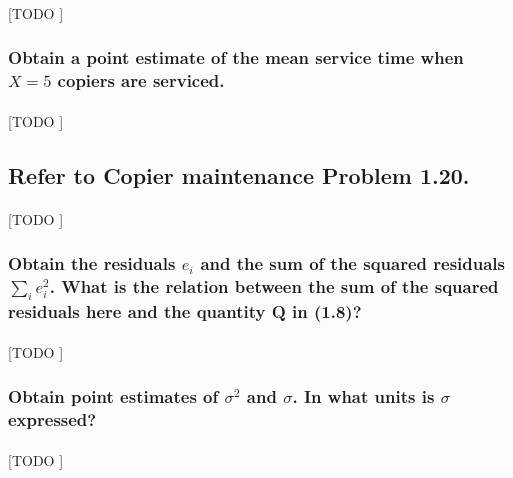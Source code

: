 \documentclass{article}
\begin{document}
        \paragraph{}
        [TODO ]

      \subsubsection{Obtain a point estimate of the mean service time when $X = 5$ copiers are serviced.}

        \paragraph{}
        [TODO ]

    \setcounter{subsection}{23}
    \subsection{Refer to \textbf{Copier maintenance} Problem 1.20.}

      \paragraph{}
      [TODO ]

      \subsubsection{Obtain the residuals $e_i$ and the sum of the squared residuals $\sum_i e_i^2$. What is the relation between the sum of the squared residuals here and the quantity Q in (1.8)?}

        \paragraph{}
        [TODO ]

      \subsubsection{Obtain point estimates of $\sigma^2$ and $\sigma$. In what units is $\sigma$ expressed?}

        \paragraph{}
        [TODO ]

    \setcounter{section}{2}

    \setcounter{subsection}{4}
\end{document}
